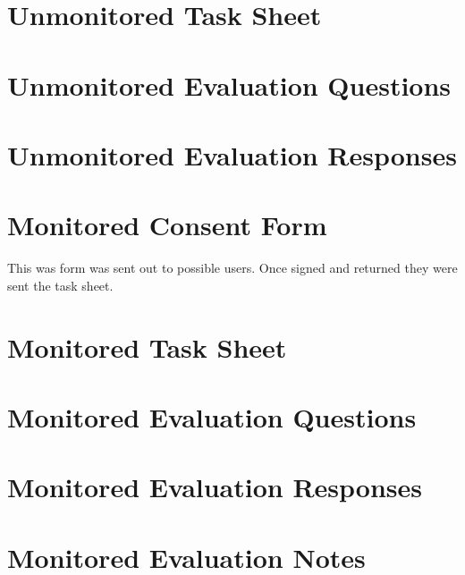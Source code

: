 \documentclass{l4proj}
\begin{document}
\begin{appendices}

\section{Unmonitored Task Sheet}

\section{Unmonitored Evaluation Questions}

\section{Unmonitored Evaluation Responses}



\section{Monitored Consent Form}
This was form was sent out to possible users. Once signed and returned they were sent the task sheet.


\section{Monitored Task Sheet}

\section{Monitored Evaluation Questions}

\section{Monitored Evaluation Responses}

\section{Monitored Evaluation Notes}



\end{appendices}
\end{document}
